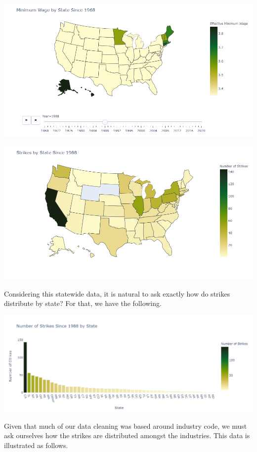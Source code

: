 \documentclass[reqno,11pt]{amsart}
\begin{document}
\includegraphics[width=1\textwidth]{minwage88.png}

\includegraphics[width=1\textwidth]{strikes88}




Considering this statewide data, it is natural to ask exactly how do strikes distribute by state? 
For that, we have the following.

\includegraphics[width=1\textwidth]{strikesByState.png}

Given that much of our data cleaning was based around industry code, we must ask ourselves
how the strikes are distributed amongst the industries. This data is illustrated as follows.
\end{document}
